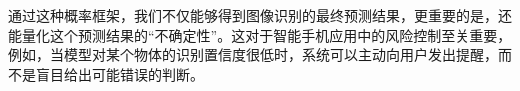 通过这种概率框架，我们不仅能够得到图像识别的最终预测结果，更重要的是，还能量化这个预测结果的“不确定性”。这对于智能手机应用中的风险控制至关重要，例如，当模型对某个物体的识别置信度很低时，系统可以主动向用户发出提醒，而不是盲目给出可能错误的判断。
%
%
%
%
%
%
%
%
